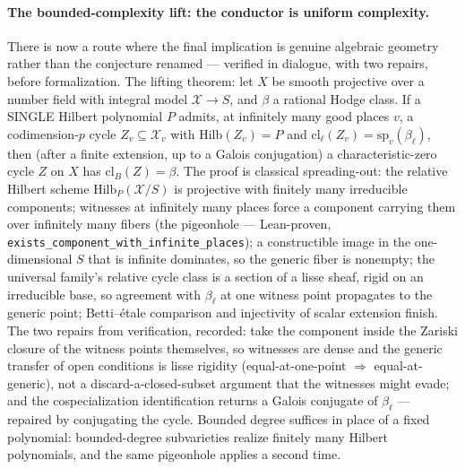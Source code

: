 \documentclass[11pt]{article}
\theoremstyle{definition}
\theoremstyle{remark}
\begin{document}
\paragraph{The bounded-complexity lift: the conductor is uniform
complexity.}  There is now a route where the final implication is
genuine algebraic geometry rather than the conjecture renamed ---
verified in dialogue, with two repairs, before formalization.  The
lifting theorem: let $X$ be smooth projective over a number field
with integral model $\mathcal X\to S$, and $\beta$ a rational Hodge
class.  If a SINGLE Hilbert polynomial $P$ admits, at infinitely many
good places $v$, a codimension-$p$ cycle $Z_v\subseteq\mathcal X_v$
with $\mathrm{Hilb}(Z_v)=P$ and
$\mathrm{cl}_\ell(Z_v)=\mathrm{sp}_v(\beta_\ell)$, then (after a
finite extension, up to a Galois conjugation) a
characteristic-zero cycle $Z$ on $X$ has $\mathrm{cl}_B(Z)=\beta$.
The proof is classical spreading-out: the relative Hilbert scheme
$\mathrm{Hilb}_P(\mathcal X/S)$ is projective with finitely many
irreducible components; witnesses at infinitely many places force a
component carrying them over infinitely many fibers (the pigeonhole
--- Lean-proven, \texttt{exists\_component\_with\_infinite\_places});
a constructible image in the one-dimensional $S$ that is infinite
dominates, so the generic fiber is nonempty; the universal family's
relative cycle class is a section of a lisse sheaf, rigid on an
irreducible base, so agreement with $\beta_\ell$ at one witness point
propagates to the generic point; Betti--\'etale comparison and
injectivity of scalar extension finish.  The two repairs from
verification, recorded: take the component inside the Zariski closure
of the witness points themselves, so witnesses are dense and the
generic transfer of open conditions is lisse rigidity
(equal-at-one-point $\Rightarrow$ equal-at-generic), not a
discard-a-closed-subset argument that the witnesses might evade; and
the cospecialization identification returns a Galois conjugate of
$\beta_\ell$ --- repaired by conjugating the cycle.  Bounded degree
suffices in place of a fixed polynomial: bounded-degree subvarieties
realize finitely many Hilbert polynomials, and the same pigeonhole
applies a second time.
\end{document}

